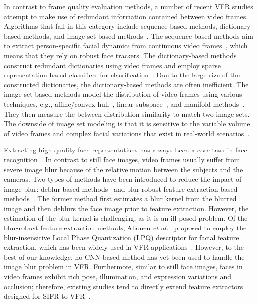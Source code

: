 \documentclass[10pt,journal,cspaper,compsoc]{IEEEtran}
\begin{document}
In contrast to frame quality evaluation methods, a number of recent VFR studies attempt to make use of redundant information contained between video frames.
Algorithms that fall in this category include sequence-based methods, dictionary-based methods, and image set-based methods~\cite{barr2012face}.
The sequence-based methods aim to extract person-specific facial dynamics from continuous video frames~\cite{bicego2006person,hadid2009combining},
which means that they rely on robust face trackers.
The dictionary-based methods construct redundant dictionaries using video frames
and employ sparse representation-based classifiers for classification~\cite{chen2012dictionary,liu2014toward}.
Due to the large size of the constructed dictionaries, the dictionary-based methods are often inefficient.
The image set-based methods model the distribution of video frames using various techniques, e.g., affine/convex hull~\cite{hu2012face,zhu2014image},
linear subspace~\cite{Huang2015Benchmark}, and manifold methods~\cite{harandi2011graph,cui2012image}.
They then measure the between-distribution similarity to match two image sets.
The downside of image set modeling is that it is sensitive to the variable volume of video frames
and complex facial variations that exist in real-world scenarios~\cite{shao2015comparative}.

Extracting high-quality face representations has always been a core task in face recognition~\cite{ding2015comprehensive}.
In contrast to still face images, video frames usually suffer from severe image blur because of the relative motion between the subjects and the cameras.
Two types of methods have been introduced to reduce the impact of image blur:
deblur-based methods~\cite{nishiyama2011facial} and blur-robust feature extraction-based methods~\cite{gopalan2012blur,chan2013multiscale}.
The former method first estimates a blur kernel from the blurred image and then deblurs the face image prior to feature extraction.
However, the estimation of the blur kernel is challenging, as it is an ill-posed problem.
Of the blur-robust feature extraction methods,
Ahonen \textit{et al.}~\cite{ahonen2008recognition} proposed to employ the blur-insensitive Local Phase Quantization (LPQ) descriptor for facial feature extraction,
which has been widely used in VFR applications~\cite{Ross2015report}.
However, to the best of our knowledge, no CNN-based method has yet been used to handle the image blur problem in VFR.
Furthermore, similar to still face images, faces in video frames exhibit rich pose, illumination, and expression variations and occlusion;
therefore, existing studies tend to directly extend feature extractors designed for SIFR to VFR~\cite{parkhi2014compact,li2014eigen,chen2016efficient}.
\end{document}
